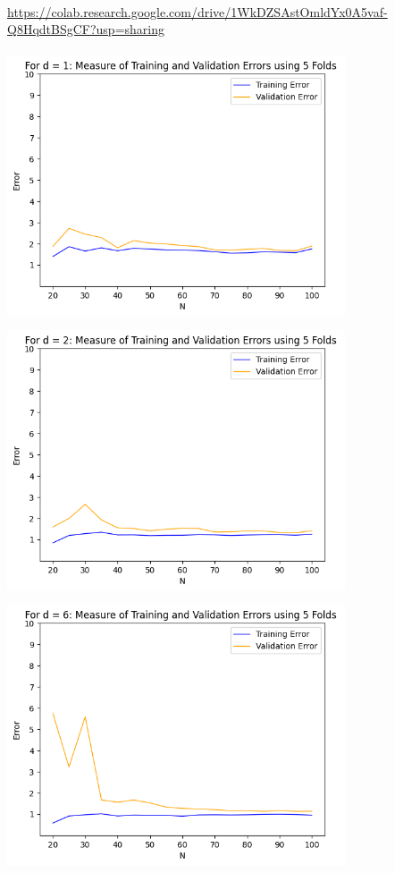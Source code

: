 \begin{solution}
  \\
  \url{https://colab.research.google.com/drive/1WkDZSAstOmldYx0A5vaf-Q8HqdtBSgCF?usp=sharing} \\
  \graphicspath{{images/}}
  \includegraphics[width=10cm, height=8cm]{Problem_2_d=1.png}\\
  \includegraphics[width=10cm, height=8cm]{Problem_2_d=2.png}\\
  \includegraphics[width=10cm, height=8cm]{Problem_2_d=6.png}\\

\end{solution}

